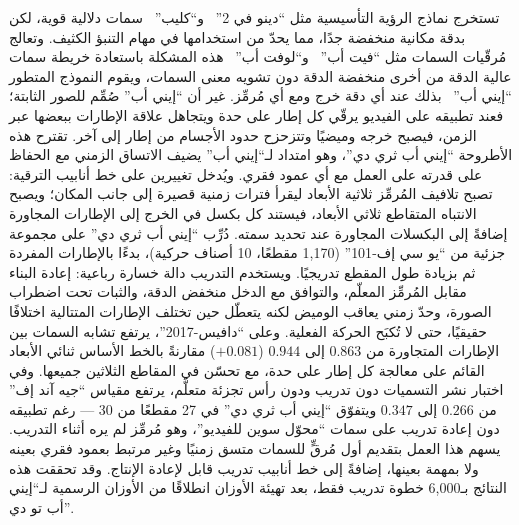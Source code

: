 تستخرج نماذج الرؤية التأسيسية مثل ``دينو في 2''~\cite{dinov2} و``كليب''~\cite{radford2021clip}
سمات دلالية قوية، لكن بدقة مكانية منخفضة جدًا، مما يحدّ من استخدامها في مهام التنبؤ الكثيف.
وتعالج مُرقّيات السمات مثل ``فيت أب''~\cite{featup} و``لوفت أب''~\cite{loftup} هذه المشكلة
باستعادة خريطة سمات عالية الدقة من أخرى منخفضة الدقة دون تشويه معنى السمات، ويقوم النموذج
المتطور ``إيني أب''~\cite{anyup} بذلك عند أي دقة خرج ومع أي مُرمِّز. غير أن ``إيني أب'' صُمِّم
للصور الثابتة؛ فعند تطبيقه على الفيديو يرقّي كل إطار على حدة ويتجاهل علاقة الإطارات ببعضها
عبر الزمن، فيصبح خرجه وميضيًا وتتزحزح حدود الأجسام من إطار إلى آخر. تقترح هذه الأطروحة
``إيني أب ثري دي''، وهو امتداد لـ``إيني أب'' يضيف الاتساق الزمني مع الحفاظ على قدرته على
العمل مع أي عمود فقري. ويُدخل تغييرين على خط أنابيب الترقية: تصبح تلافيف المُرمِّز ثلاثية
الأبعاد ليقرأ فترات زمنية قصيرة إلى جانب المكان؛ ويصبح الانتباه المتقاطع ثلاثي الأبعاد،
فيستند كل بكسل في الخرج إلى الإطارات المجاورة إضافةً إلى البكسلات المجاورة عند تحديد سمته.
دُرِّب ``إيني أب ثري دي'' على مجموعة جزئية من ``يو سي إف-101'' (1{,}170 مقطعًا، 10 أصناف
حركية)، بدءًا بالإطارات المفردة ثم بزيادة طول المقطع تدريجيًا. ويستخدم التدريب دالة خسارة
رباعية: إعادة البناء مقابل المُرمِّز المعلّم، والتوافق مع الدخل منخفض الدقة، والثبات تحت
اضطراب الصورة، وحدّ زمني يعاقب الوميض لكنه يتعطّل حين تختلف الإطارات المتتالية اختلافًا
حقيقيًا، حتى لا تُكبَح الحركة الفعلية. وعلى ``دافيس-2017''، يرتفع تشابه السمات بين الإطارات
المتجاورة من $0.863$ إلى $0.944$ ($+0.081$) مقارنةً بالخط الأساس ثنائي الأبعاد القائم على
معالجة كل إطار على حدة، مع تحسّن في المقاطع الثلاثين جميعها. وفي اختبار نشر التسميات دون
تدريب ودون رأس تجزئة متعلَّم، يرتفع مقياس ``جيه آند إف'' من $0.266$ إلى $0.347$ ويتفوّق
``إيني أب ثري دي'' في 27 مقطعًا من 30 --- رغم تطبيقه دون إعادة تدريب على سمات ``محوّل سوين
للفيديو''، وهو مُرمِّز لم يره أثناء التدريب. يسهم هذا العمل بتقديم أول مُرقٍّ للسمات متسق
زمنيًا وغير مرتبط بعمود فقري بعينه ولا بمهمة بعينها، إضافةً إلى خط أنابيب تدريب قابل
لإعادة الإنتاج. وقد تحققت هذه النتائج بـ6{,}000 خطوة تدريب فقط، بعد تهيئة الأوزان انطلاقًا
من الأوزان الرسمية لـ``إيني أب تو دي''.